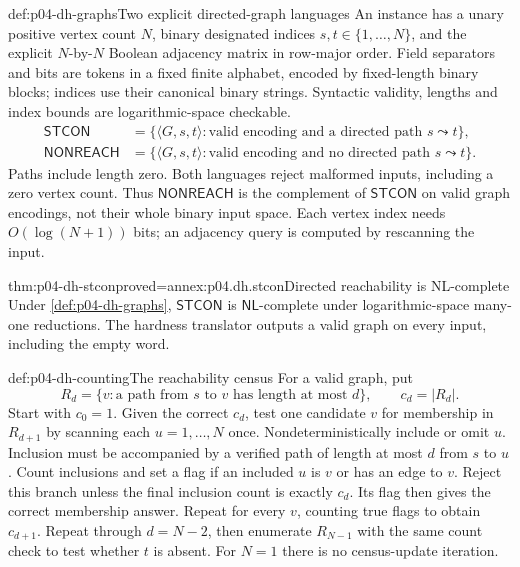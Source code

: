 \begin{hbdefinition}{def:p04-dh-graphs}{Two explicit directed-graph languages}
An instance has a unary positive vertex count \(N\), binary designated
indices \(s,t\in\{1,\ldots,N\}\), and the explicit \(N\)-by-\(N\) Boolean
adjacency matrix in row-major order. Field separators and bits are tokens
in a fixed finite alphabet, encoded by fixed-length binary blocks; indices
use their canonical binary strings. Syntactic validity, lengths and index
bounds are logarithmic-space checkable.
\[
\begin{aligned}
 \mathsf{STCON}&=\{\langle G,s,t\rangle:
       \text{valid encoding and a directed path }s\leadsto t\},\\
 \mathsf{NONREACH}&=\{\langle G,s,t\rangle:
       \text{valid encoding and no directed path }s\leadsto t\}.
\end{aligned}
\]
Paths include length zero. Both languages reject malformed inputs,
including a zero vertex count. Thus \(\mathsf{NONREACH}\) is the complement
of \(\mathsf{STCON}\) on valid graph encodings, not their whole binary
input space. Each vertex index needs \(O(\log(N+1))\) bits; an adjacency
query is computed by rescanning the input.
\end{hbdefinition}

\begin{hbtheorem}{thm:p04-dh-stcon}{proved=annex:p04.dh.stcon}{Directed reachability is NL-complete}
Under \cref{def:p04-dh-graphs}, \(\mathsf{STCON}\) is
\(\mathsf{NL}\)-complete under logarithmic-space many-one reductions.
The hardness translator outputs a valid graph on every input, including
the empty word.
\end{hbtheorem}

\begin{hbmethod}{def:p04-dh-counting}{The reachability census}
For a valid graph, put
\[
 R_d=\{v:\text{a path from }s\text{ to }v\text{ has length at most }d\},
 \qquad c_d=|R_d|.
\]
Start with \(c_0=1\). Given the correct \(c_d\), test one candidate \(v\)
for membership in \(R_{d+1}\) by scanning each \(u=1,\ldots,N\) once.
Nondeterministically include or omit \(u\). Inclusion must be accompanied
by a verified path of length at most \(d\) from \(s\) to \(u\).
Count inclusions and set a flag if an included \(u\) is \(v\) or has an
edge to \(v\). Reject this branch unless the final inclusion count is
exactly \(c_d\). Its flag then gives the correct membership answer.
Repeat for every \(v\), counting true flags to obtain \(c_{d+1}\).
Repeat through \(d=N-2\), then enumerate \(R_{N-1}\) with the same
count check to test whether \(t\) is absent. For \(N=1\) there is no
census-update iteration.
\end{hbmethod}

